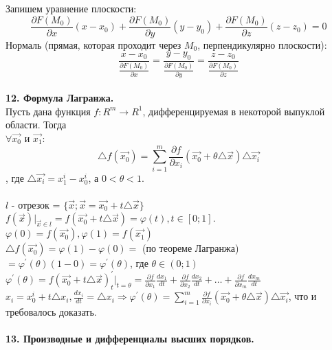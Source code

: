 \documentclass[12pt]{article}
\begin{document}
Запишем уравнение плоскости:\\
$$\frac{\partial F(M_0)}{\partial x}(x-x_0)+\frac{\partial F(M_0)}{\partial y}(y-y_0)+\frac{\partial F(M_0)}{\partial z}(z-z_0)=0$$
Нормаль (прямая, которая проходит через $M_0$, перпендикулярно плоскости):\\
$$\frac{x-x_0}{\frac{\partial F(M_0)}{\partial x}}=\frac{y-y_0}{\frac{\partial F(M_0)}{\partial y}}=\frac{z-z_0}{\frac{\partial F(M_0)}{\partial z}}$$
\\
\label{question12}\textbf{12. Формула Лагранжа.}\\
Пусть дана функция $f:R^m\to R^1$, дифференцируемая в некоторой выпуклой области. Тогда\\
$\forall \overrightarrow{x_0}$ и $\overrightarrow{x_1}:$\\
$${\bigtriangleup f(\overrightarrow{x_0})}=\sum_{i=1}^m \frac{\partial f}{\partial x_i} (\overrightarrow{x_0}+\theta {\bigtriangleup \overrightarrow{x}}){\bigtriangleup \overrightarrow{x_i}}$$,
где ${\bigtriangleup \overrightarrow{x_i}} = x_1^i - x_0^i$, а $0<\theta<1$.\\
\\
$l$ - отрезок = $\{ \overrightarrow{x}; \overrightarrow{x} = \overrightarrow{x_0}+t{\bigtriangleup\overrightarrow{x}} \}$\\
$f(\overrightarrow{x})|_{\overrightarrow{x}\in l}=f(\overrightarrow{x_0}+t{\bigtriangleup\overrightarrow{x}}) = \varphi(t), t \in [0;1]$.\\
$\varphi(0) = f(\overrightarrow{x_0}), \varphi(1) = f(\overrightarrow{x_1})$\\
${\bigtriangleup f(\overrightarrow{x_0})} = \varphi(1)-\varphi(0)=$ (по теореме Лагранжа) $=\varphi^{'}(\theta)(1-0)=\varphi^{'}(\theta)$, где $\theta \in (0;1)$\\
$\varphi^{'}(\theta)=f(\overrightarrow{x_0}+t{\bigtriangleup\overrightarrow{x}})^{'}_t|_{t=\theta}=\frac{\partial f}{\partial x_1}\frac{dx_1}{dt}+\frac{\partial f}{\partial x_2}\frac{dx_2}{dt}+\dots+\frac{\partial f}{\partial x_m}\frac{dx_m}{dt}$\\
$x_i = x_0^i+t{\bigtriangleup x_i}, \frac{dx_i}{dt}={\bigtriangleup x_i} \Rightarrow \varphi^{'}(\theta)=\sum_{i=1}^m \frac{\partial f}{\partial x_i} (\overrightarrow{x_0}+\theta {\bigtriangleup \overrightarrow{x}}){\bigtriangleup \overrightarrow{x_i}}$, что и требовалось доказать.\\
\\
\label{question13_1}\textbf{13. Производные и дифференциалы высших порядков.}\\
\end{document}
